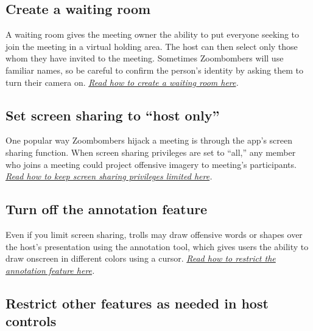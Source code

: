 \hypertarget{create-a-waiting-room}{%
\subsection{Create a waiting room}\label{create-a-waiting-room}}

A waiting room gives the meeting owner the ability to put everyone
seeking to join the meeting in a virtual holding area. The host can then
select only those whom they have invited to the meeting. Sometimes
Zoombombers will use familiar names, so be careful to confirm the
person's identity by asking them to turn their camera on.
\href{https://support.zoom.us/hc/en-us/articles/115000332726-Waiting-Room}{\emph{Read
how to create a waiting room here}}\emph{.}

\hypertarget{set-screen-sharing-to-host-only}{%
\subsection{Set screen sharing to ``host
only''}\label{set-screen-sharing-to-host-only}}

One popular way Zoombombers hijack a meeting is through the app's screen
sharing function. When screen sharing privileges are set to ``all,'' any
member who joins a meeting could project offensive imagery to meeting's
participants.
\href{https://support.zoom.us/hc/en-us/articles/115005759423}{\emph{Read
how to keep screen sharing privileges limited here}}\emph{.}

\hypertarget{turn-off-the-annotation-feature}{%
\subsection{Turn off the annotation
feature}\label{turn-off-the-annotation-feature}}

Even if you limit screen sharing, trolls may draw offensive words or
shapes over the host's presentation using the annotation tool, which
gives users the ability to draw onscreen in different colors using a
cursor.
\href{https://support.zoom.us/hc/en-us/articles/201362603-Host-and-Co-Host-Controls-in-a-Meeting}{\emph{Read
how to restrict the annotation feature here}}\emph{.}

\hypertarget{restrict-other-features-as-needed-in-host-controls}{%
\subsection{Restrict other features as needed in host
controls}\label{restrict-other-features-as-needed-in-host-controls}}

